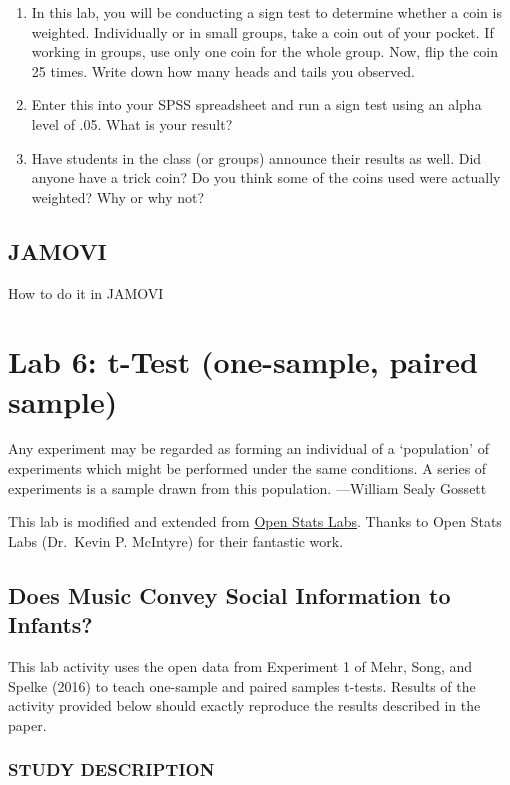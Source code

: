 \documentclass[]{book}
\begin{document}
\begin{enumerate}
\def\labelenumi{\arabic{enumi}.}
\item
  In this lab, you will be conducting a sign test to determine whether a
  coin is weighted. Individually or in small groups, take a coin out of
  your pocket. If working in groups, use only one coin for the whole
  group. Now, flip the coin 25 times. Write down how many heads and
  tails you observed.
\item
  Enter this into your SPSS spreadsheet and run a sign test using an
  alpha level of .05. What is your result?
\item
  Have students in the class (or groups) announce their results as well.
  Did anyone have a trick coin? Do you think some of the coins used were
  actually weighted? Why or why not?
\end{enumerate}

\section{JAMOVI}\label{jamovi-5}

How to do it in JAMOVI

\chapter{Lab 6: t-Test (one-sample, paired
sample)}\label{lab-6-t-test-one-sample-paired-sample}

{ Any experiment may be regarded as forming an individual of a
`population' of experiments which might be performed under the same
conditions. A series of experiments is a sample drawn from this
population. ---William Sealy Gossett }

This lab is modified and extended from
\href{https://sites.trinity.edu/osl}{Open Stats Labs}. Thanks to Open
Stats Labs (Dr.~Kevin P. McIntyre) for their fantastic work.

\section{Does Music Convey Social Information to
Infants?}\label{does-music-convey-social-information-to-infants}

This lab activity uses the open data from Experiment 1 of Mehr, Song,
and Spelke (2016) to teach one-sample and paired samples t-tests.
Results of the activity provided below should exactly reproduce the
results described in the paper.

\subsection{STUDY DESCRIPTION}\label{study-description}
\end{document}
